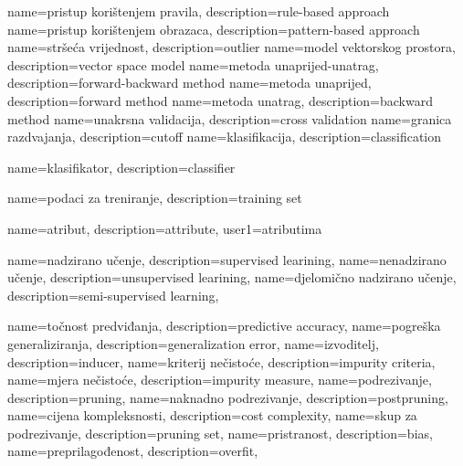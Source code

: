 {
  name=pristup korištenjem pravila,
  description={rule-based approach}
}
{
  name=pristup korištenjem obrazaca,
  description={pattern-based approach}
}
{
  name=stršeća vrijednost,
  description={outlier}
}
{
  name=model vektorskog prostora,
  description={vector space model}
}
{
  name=metoda unaprijed-unatrag,
  description={forward-backward method}
}
{
  name=metoda unaprijed,
  description={forward method}
}
{
  name=metoda unatrag,
  description={backward method}
}
{
  name=unakrsna validacija,
  description={cross validation}
}
{
  name=granica razdvajanja,
  description={cutoff}
}
{
  name=klasifikacija,
  description={classification}
}

{
  name=klasifikator,
  description={classifier}
}

{
  name=podaci za treniranje,
  description={training set}
}

{
  name=atribut,
  description={attribute},
  user1=atributima
}

{
  name={nadzirano učenje},
  description={supervised learining},
}
{
  name={nenadzirano učenje},
  description={unsupervised learining},
}
{
  name={djelomično nadzirano učenje},
  description={semi-supervised learning},
}

{
  name={točnost predviđanja},
  description={predictive accuracy},
}
{
  name={pogreška generaliziranja},
  description={generalization error},
}
{
  name={izvoditelj},
  description={inducer},
}
{
  name={kriterij nečistoće},
  description={impurity criteria},
}
{
  name={mjera nečistoće},
  description={impurity measure},
}
{
  name={podrezivanje},
  description={pruning},
}
{
  name={naknadno podrezivanje},
  description={postpruning},
}
{
  name={cijena kompleksnosti},
  description={cost complexity},
}
{
  name={skup za podrezivanje},
  description={pruning set},
}
{
  name={pristranost},
  description={bias},
}
{
  name={preprilagođenost},
  description={overfit},
}

